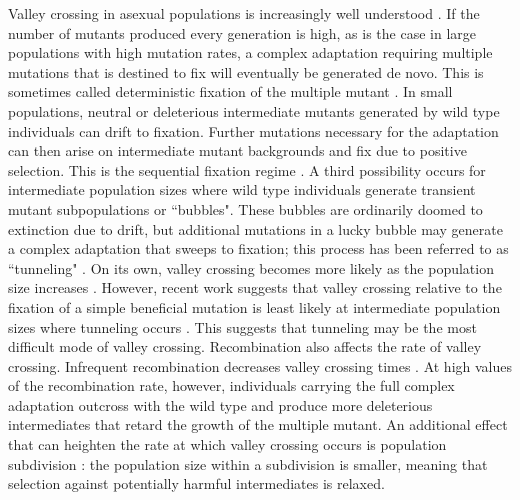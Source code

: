 \documentclass[10pt,twocolumn,twoside]{gsajnl}
\begin{document}
\begin{spacing}{1.5}
Valley crossing in asexual populations is increasingly well understood \citep{weissman_2009}.
If the number of mutants produced every generation is high, as is the case in large populations with high mutation rates, a complex adaptation requiring multiple mutations that is destined to fix will eventually be generated de novo.
This is sometimes called deterministic fixation of the multiple mutant \citep{weissman_2009}.
In small populations, neutral or deleterious intermediate mutants generated by wild type individuals can drift to fixation. Further mutations necessary for the adaptation can then arise on intermediate mutant backgrounds and fix due to positive selection.
This is the sequential fixation regime \citep{weissman_2009}.
A third possibility occurs for intermediate population sizes where wild type individuals generate transient mutant subpopulations or ``bubbles".
These bubbles are ordinarily doomed to extinction due to drift, but additional mutations in a lucky bubble may generate a complex adaptation that sweeps to fixation; this process has been referred to as ``tunneling" \citep{iwasa_2004, weissman_2009}.
On its own, valley crossing becomes more likely as the population size increases \citep{weissman_2009}. However, recent work suggests that valley crossing relative to the fixation of a simple beneficial mutation is least likely at intermediate population sizes where tunneling occurs \citet{ochs_2015}. This suggests that tunneling may be the most difficult mode of valley crossing. 
Recombination also affects the rate of valley crossing.
Infrequent recombination decreases valley crossing times \citep{weissman_2010}.
At high values of the recombination rate, however, individuals carrying the full complex adaptation outcross with the wild type and produce more deleterious intermediates that retard the growth of the multiple mutant.
An additional effect that can heighten the rate at which valley crossing occurs is population subdivision \citep{Bitbol:Schwab:2014}: the population size within a subdivision is smaller, meaning that selection against potentially harmful intermediates is relaxed.


\end{spacing}
\end{document}
